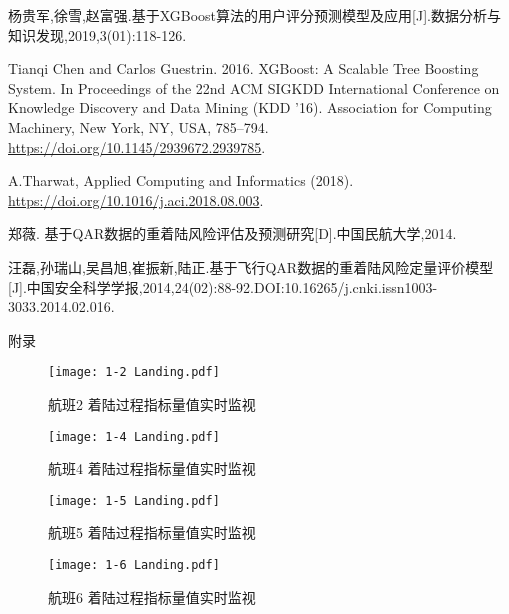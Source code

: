 \documentclass{MathorCupModeling}
\begin{document}
\begin{spacing}{1.08}
\begin{thebibliography}{99}
	杨贵军,徐雪,赵富强.基于XGBoost算法的用户评分预测模型及应用[J].数据分析与知识发现,2019,3(01):118-126.

	Tianqi Chen and Carlos Guestrin. 2016. XGBoost: A Scalable Tree Boosting System. In Proceedings of the 22nd ACM SIGKDD International Conference on Knowledge Discovery and Data Mining (KDD '16). Association for Computing Machinery, New York, NY, USA, 785–794. \url{https://doi.org/10.1145/2939672.2939785}.

	A.Tharwat, Applied Computing and Informatics (2018). \url{https://doi.org/10.1016/j.aci.2018.08.003}.

	郑薇. 基于QAR数据的重着陆风险评估及预测研究[D].中国民航大学,2014.

	汪磊,孙瑞山,吴昌旭,崔振新,陆正.基于飞行QAR数据的重着陆风险定量评价模型[J].中国安全科学学报,2014,24(02):88-92.DOI:10.16265/j.cnki.issn1003-3033.2014.02.016.
	\end{thebibliography}
	\end{spacing}
	\newpage


	\begin{center}
		\heiti{} 附\hspace{2pc}录
	\end{center}

	\begin{figure}[H]
		\centering
		\texttt{[image: 1-2 Landing.pdf]}
		\caption{航班2 着陆过程指标量值实时监视}
		\label{fig:1-2}
	\end{figure}
	\begin{figure}[H]
		\centering
		\texttt{[image: 1-4 Landing.pdf]}
		\caption{航班4 着陆过程指标量值实时监视}
		\label{fig:1-4}
	\end{figure}
	\begin{figure}[H]
		\centering
		\texttt{[image: 1-5 Landing.pdf]}
		\caption{航班5 着陆过程指标量值实时监视}
		\label{fig:1-5}
	\end{figure}
	\begin{figure}[H]
		\centering
		\texttt{[image: 1-6 Landing.pdf]}
		\caption{航班6 着陆过程指标量值实时监视}
		\label{fig:1-6}
	\end{figure}
\end{document}
